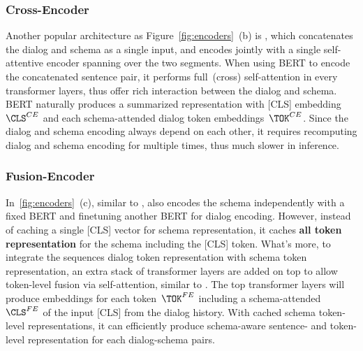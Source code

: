 \subsubsection{Cross-Encoder}
\label{sssec:sgd:cross-encoder}
Another popular architecture as Figure~\ref{fig:encoders}~(b) is \CE,
which concatenates the dialog and schema as a single input, and
encodes jointly with a single self-attentive encoder spanning over the
two segments.  When using BERT to encode the concatenated sentence
pair, it performs full~(cross) self-attention in every transformer
layers, thus offer rich interaction between the dialog and
schema. BERT naturally produces a summarized representation with [CLS]
embedding~${\CLS^{CE}}$ and each schema-attended dialog token
embeddings~${\TOK^{CE}}$. Since the dialog and schema encoding always
depend on each other, it requires recomputing dialog and schema
encoding for multiple times, thus much slower in inference.
%

\subsubsection{Fusion-Encoder}
\label{sssec:sgd:fusion-encoer}

In~\autoref{fig:encoders}~(c), similar to \DE, \FE also encodes the
schema independently with a fixed BERT and finetuning another BERT for
dialog encoding. However, instead of caching a single [CLS] vector for
schema representation, it caches {\bf all token representation} for
the schema including the [CLS] token. What's more, to integrate the
sequences dialog token representation with schema token
representation, an extra stack of transformer layers are added on top
to allow token-level fusion via self-attention, similar to \CE. The
top transformer layers will produce embeddings for each
token~${\TOK^{FE}}$ including a schema-attended ~${\CLS^{FE}}$ of the
input [CLS] from the dialog history. With cached schema token-level
representations, it can efficiently produce schema-aware sentence- and
token-level representation for each dialog-schema pairs.

